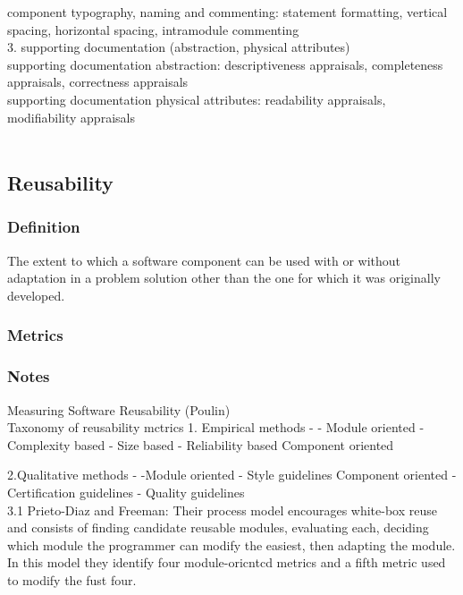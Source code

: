 \documentclass{article}
\begin{document}
component typography, naming and commenting: statement formatting, vertical spacing, horizontal spacing, intramodule commenting\\

3. supporting documentation (abstraction, physical attributes)\\
 
supporting documentation abstraction: descriptiveness appraisals, completeness appraisals, correctness appraisals\\

supporting documentation physical attributes: readability appraisals, modifiability appraisals\\

  
~\newpage

\subsection{Reusability}
\subsubsection{Definition}
The extent to which a software component can be used with or without adaptation in a problem solution other than the one for which it was originally developed.

\subsubsection{Metrics}
\subsubsection{Notes}
Measuring Software Reusability (Poulin)\\  

Taxonomy of reusability mctrics
1. Empirical methods
-
-
Module oriented
- Complexity based
- Size based
- Reliability based
Component oriented

 2.Qualitative methods
-
-Module oriented
- Style guidelines
Component oriented
- Certification guidelines
- Quality guidelines\\

3.1 Prieto-Diaz and Freeman:
Their process model encourages
white-box reuse and consists of finding candidate
reusable modules, evaluating each, deciding which
module the programmer can modify the easiest, then
adapting the module. In this model they identify
four module-oricntcd metrics and a fifth metric used
to modify the fust four.
\end{document}

